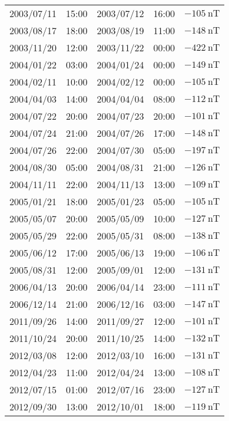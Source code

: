 \begin{table}[ht]
\begin{tabular}{ccccc}
	2003/07/11 & 15:00 & 2003/07/12 & 16:00 & $ \SI{-105}{\nano\tesla}$ \\
	2003/08/17 & 18:00 & 2003/08/19 & 11:00 & $ \SI{-148}{\nano\tesla}$ \\
	2003/11/20 & 12:00 & 2003/11/22 & 00:00 & $ \SI{-422}{\nano\tesla}$ \\
	2004/01/22 & 03:00 & 2004/01/24 & 00:00 & $ \SI{-149}{\nano\tesla}$ \\
	2004/02/11 & 10:00 & 2004/02/12 & 00:00 & $ \SI{-105}{\nano\tesla}$ \\
	2004/04/03 & 14:00 & 2004/04/04 & 08:00 & $ \SI{-112}{\nano\tesla}$ \\
	2004/07/22 & 20:00 & 2004/07/23 & 20:00 & $ \SI{-101}{\nano\tesla}$ \\
	2004/07/24 & 21:00 & 2004/07/26 & 17:00 & $ \SI{-148}{\nano\tesla}$ \\
	2004/07/26 & 22:00 & 2004/07/30 & 05:00 & $ \SI{-197}{\nano\tesla}$ \\
	2004/08/30 & 05:00 & 2004/08/31 & 21:00 & $ \SI{-126}{\nano\tesla}$ \\
	2004/11/11 & 22:00 & 2004/11/13 & 13:00 & $ \SI{-109}{\nano\tesla}$ \\
	2005/01/21 & 18:00 & 2005/01/23 & 05:00 & $ \SI{-105}{\nano\tesla}$ \\
	2005/05/07 & 20:00 & 2005/05/09 & 10:00 & $ \SI{-127}{\nano\tesla}$ \\
	2005/05/29 & 22:00 & 2005/05/31 & 08:00 & $ \SI{-138}{\nano\tesla}$ \\
	2005/06/12 & 17:00 & 2005/06/13 & 19:00 & $ \SI{-106}{\nano\tesla}$ \\
	2005/08/31 & 12:00 & 2005/09/01 & 12:00 & $ \SI{-131}{\nano\tesla}$ \\
	2006/04/13 & 20:00 & 2006/04/14 & 23:00 & $ \SI{-111}{\nano\tesla}$ \\
	2006/12/14 & 21:00 & 2006/12/16 & 03:00 & $ \SI{-147}{\nano\tesla}$ \\ 
	2011/09/26 & 14:00 & 2011/09/27 & 12:00 & $ \SI{-101}{\nano\tesla}$ \\
	2011/10/24 & 20:00 & 2011/10/25 & 14:00 & $ \SI{-132}{\nano\tesla}$ \\
	2012/03/08 & 12:00 & 2012/03/10 & 16:00 & $ \SI{-131}{\nano\tesla}$ \\
	2012/04/23 & 11:00 & 2012/04/24 & 13:00 & $ \SI{-108}{\nano\tesla}$ \\
	2012/07/15 & 01:00 & 2012/07/16 & 23:00 & $ \SI{-127}{\nano\tesla}$ \\
	2012/09/30 & 13:00 & 2012/10/01 & 18:00 & $ \SI{-119}{\nano\tesla}$ \\

\end{tabular}
\end{table}
